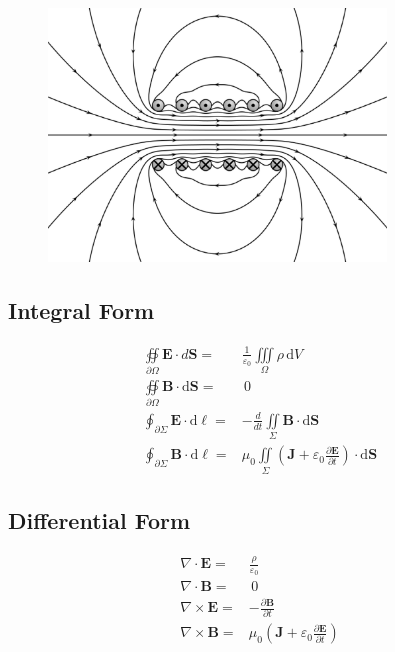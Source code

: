 \documentclass[letterpaper,10pt,titlepage]{article}
\numberwithin{equation}{section}
\begin{document}
\begin{figure}[h!]
  \centering
    \includegraphics[width=0.8\textwidth,height=0.4\textheight]{maxwell.eps}
\end{figure}

\subsection*{Integral Form}

\begin{align}
  \oiint\limits_{\partial \Omega} \mathbf{E} \cdot d\mathbf{S} =&
    \frac{1}{\varepsilon_0} \iiint\limits_{\Omega} \rho\, \mathrm{d}V \\
  \oiint\limits_{\partial \Omega} \mathbf{B} \cdot \mathrm{d}\mathbf{S} =&\, 0\\
  \oint_{\partial \Sigma} \mathbf{E} \cdot \mathrm{d}\ell =&
    -\frac{d}{dt}\iint\limits_{\Sigma}\mathbf{B} \cdot \mathrm{d}\mathbf{S} \\
  \oint_{\partial \Sigma} \mathbf{B} \cdot \mathrm{d}\ell =& \mu_0
      \iint\limits_{\Sigma}
      \left(
        \mathbf{J} + \varepsilon_0 \frac{\partial\mathbf{E}}{\partial t}
      \right)
      \cdot \mathrm{d}\mathbf{S}
\end{align}

\subsection*{Differential Form}

\begin{align}
  \nabla \cdot \mathbf{E} =& \frac{\rho}{\varepsilon_0}\\
  \nabla \cdot \mathbf{B} =&\, 0\\
  \nabla \times \mathbf{E} =& - \frac{\partial\mathbf{B}}{\partial t}\\
  \nabla \times \mathbf{B} =& \mu_0
      \left(
        \mathbf{J} + \varepsilon_0 \frac{\partial\mathbf{E}}{\partial t}
      \right)
\end{align}
\end{document}
